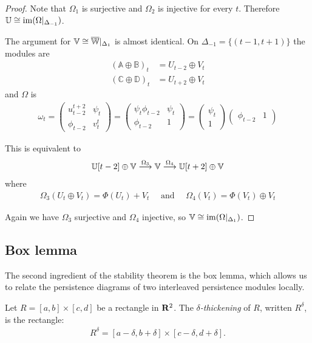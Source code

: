 \begin{proof}
Note that $\Omega_1$ is surjective and $\Omega_2$ is injective for every $t$. Therefore $\mathbb{U} \cong \operatorname{im}(\Omega|_{\Delta_{-1}})$.

The argument for $\mathbb{V} \cong \overline{\mathbb{W}}|_{\Delta_1}$ is almost identical. On $\Delta_{-1} = \{(t-1, t+1)\}$ the modules are
\begin{align*}
(\mathbb{A} \oplus \mathbb{B})_t &= U_{t-2} \oplus V_t \\
(\mathbb{C} \oplus \mathbb{D})_t &= U_{t+2} \oplus V_t
\end{align*}
and $\Omega$ is
\begin{align*}
\omega_t = \begin{pmatrix}
u_{t-2}^{t+2} & \psi_t \\
\phi_{t-2} & v_t^t
\end{pmatrix}
= \begin{pmatrix}
\psi_t \phi_{t-2} & \psi_t \\
\phi_{t-2} & 1
\end{pmatrix}
= \begin{pmatrix}
\psi_t \\ 1
\end{pmatrix} 
\begin{pmatrix}
\phi_{t-2} & 1
\end{pmatrix}
\end{align*}

This is equivalent to 
\begin{align*}
\mathbb{U}[t-2] \oplus \mathbb{V} \overset{\Omega_3}{\longrightarrow} \mathbb{V} \overset{\Omega_4}{\longrightarrow} \mathbb{U}[t+2] \oplus \mathbb{V}
\end{align*}
where
\begin{align*}
\Omega_3(U_t \oplus V_t) = \Phi(U_t) + V_t \quad \text{ and } \quad \Omega_4(V_t) = \Phi(V_t) \oplus V_t
\end{align*}

Again we have $\Omega_3$ surjective and $\Omega_4$ injective, so $\mathbb{V} \cong \operatorname{im}(\Omega|_{\Delta_{1}})$.
\end{proof}

\subsection{Box lemma}

The second ingredient of the stability theorem is the box lemma, which allows us to relate the persistence diagrams of two interleaved persistence modules locally.

Let $R = [a, b] \times [c, d]$ be a rectangle in $\mathbf{R}^2$. The \emph{$\delta$-thickening} of $R$, written $R^\delta$, is the rectangle:
\begin{align*}
  R^\delta = [a - \delta, b + \delta] \times [c - \delta, d + \delta].
\end{align*}

